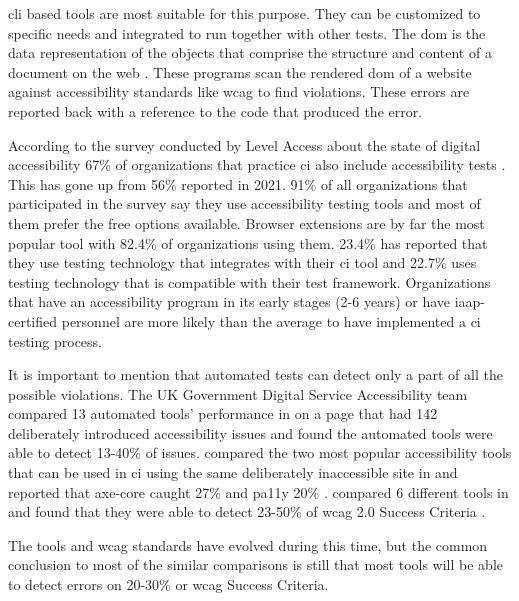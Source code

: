 \documentclass{master_thesis}
\begin{document}
\ac{cli} based tools are most suitable for this purpose. They can be customized to specific needs and integrated to run together with other tests. The \ac{dom} is the data representation of the objects that comprise the structure and content of a document on the web \citep{MDN2023}. These programs scan the rendered \ac{dom} of a website against accessibility standards like \ac{wcag} to find violations. These errors are reported back with a reference to the code that produced the error.

According to the survey conducted by Level Access about the state of digital accessibility 67\% of organizations that practice \ac{ci} also include accessibility tests \citep{LevelAccess}. This has gone up from 56\% reported in 2021. 91\% of all organizations that participated in the survey say they use accessibility testing tools and most of them prefer the free options available. Browser extensions are by far the most popular tool with 82.4\% of organizations using them. 23.4\% has reported that they use testing technology that integrates with their \ac{ci} tool and 22.7\% uses testing technology that is compatible with their test framework. Organizations that have an accessibility program in its early stages (2-6 years) or have \ac{iaap}-certified personnel are more likely than the average to have implemented a \ac{ci} testing process.

It is important to mention that automated tests can detect only a part of all the possible violations. The UK Government Digital Service Accessibility team compared 13 automated tools' performance in \citeyear{GAT2018} on a page that had 142 deliberately introduced accessibility issues and found the automated tools were able to detect 13-40\% of issues. \citeauthor{Abbott2021} compared the two most popular accessibility tools that can be used in \ac{ci} using the same deliberately inaccessible site in \citeyear{Abbott2021} and reported that axe-core caught 27\% and pa11y 20\% \citep{Abbott2021}. \citeauthor{Vigo2013} compared 6 different tools in \citeyear{Vigo2013} and found that they were able to detect 23-50\% of  \ac{wcag} 2.0 Success Criteria \citep{GAT2018, Abbott2021, Vigo2013}.

The tools and \ac{wcag} standards have evolved during this time, but the common conclusion to most of the similar comparisons is still that most tools will be able to detect errors on 20-30\% or \ac{wcag} Success Criteria. 
\end{document}
